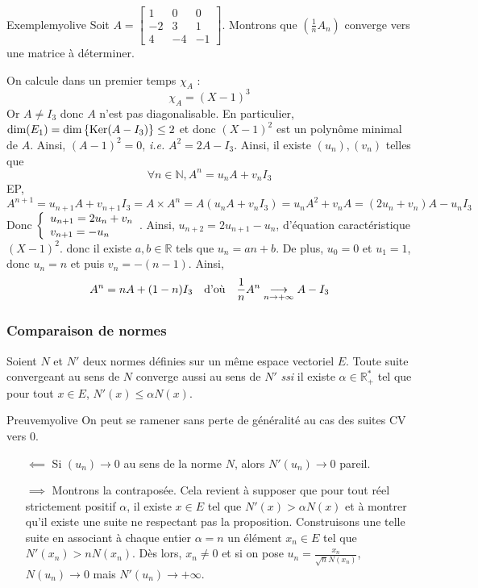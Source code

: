     \begin{omed}{Exemple}{myolive}
        Soit $A = \begin{bmatrix}
            1 & 0 & 0 \\
            -2 & 3 & 1 \\
            4 & -4 & -1
        \end{bmatrix}$. Montrons que $(\frac{1}{n} A_n)$ converge vers une matrice à déterminer. 

        On calcule dans un premier temps $\chi_A$ : 
        \[ \chi_A = (X - 1)^3 \]   
        Or $A \neq I_3$ donc $A$ n’est pas diagonalisable. En particulier, $\dim(E_1) = \dim\left\{\operatorname{Ker}(A - I_3)\right\} \leq 2$ et donc $(X - 1)^2$ est un polynôme minimal de $A$. Ainsi, $(A - 1)^2 = 0$, \textit{i.e.} $A^2 = 2 A - I_3$. Ainsi, il existe $(u_n), (v_n)$ telles que 
        \[ \forall n \in \mathbb{N}, A^n = u_n A + v_n I_3 \]   
        EP, 
        \[ A^{n+1} = u_{n+1} A + v_{n+1} I_3 = A \times A^n = A(u_n A + v_n I_3) = u_n A^2 + v_n A = (2 u_n + v_n) A - u_n I_3 \]
        Donc $\et{u_{n+1} = 2 u_n + v_n}{v_{n+1} = - u_n}$. Ainsi, $u_{n+2} = 2 u_{n+1} - u_n$, d’équation caractéristique $(X - 1)^2$. donc il existe $a,b \in \mathbb{R}$ tels que $u_n = a n + b$. De plus, $u_0 = 0$ et $u_1 = 1$, donc $u_n = n$ et puis $v_n = -(n-1)$. Ainsi, 
        \[ A^n = n A + (1-n) I_3 \quad \text{d’où} \quad \frac{1}{n} A^n \underset{n \rightarrow +\infty}{\longrightarrow} A - I_3 \]
    \end{omed}

    \subsubsection{Comparaison de normes}

    \begin{prop}{}{}
        Soient $N$ et $N'$ deux normes définies sur un même espace vectoriel $E$. Toute suite convergeant au sens de $N$ converge aussi au sens de $N'$ \textit{ssi} il existe $\alpha \in \mathbb{R}_+^*$ tel que pour tout $x \in E$, $N'(x) \leq \alpha N(x)$.
    \end{prop}

    \begin{demo}{Preuve}{myolive}
        On peut se ramener sans perte de généralité au cas des suites CV vers $0$. 
        \begin{itemize}
            \item[$\impliedby$] Si $(u_n) \to 0$ au sens de la norme $N$, alors $N'(u_n) \to 0$ pareil.
            \item[$\implies$] Montrons la contraposée. Cela revient à supposer que pour tout réel strictement positif $\alpha$, il existe $x \in E$ tel que $N'(x) > \alpha N(x)$ et à montrer qu’il existe une suite ne respectant pas la proposition. Construisons une telle suite en associant à chaque entier $\alpha = n$ un élément $x_n \in E$ tel que $N'(x_n) > n N(x_n)$. Dès lors, $x_n \neq 0$ et si on pose $u_n = \frac{x_n}{\sqrt{n} N(x_n)}$, $N(u_n) \to 0$ mais $N'(u_n) \to +\infty$.
        \end{itemize}
    \end{demo}

